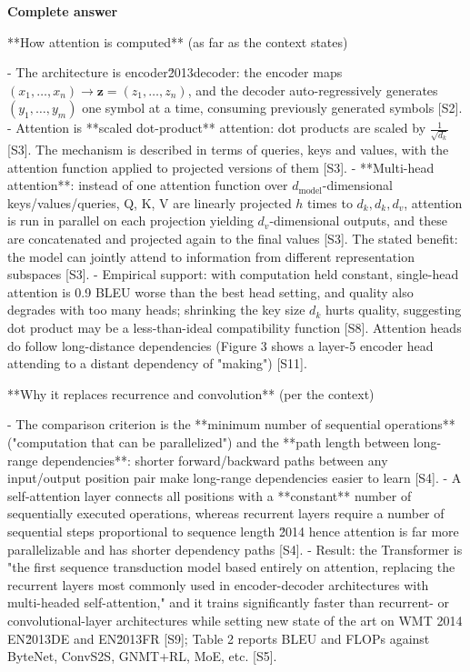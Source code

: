 \documentclass[10pt]{article}
\begin{document}
\textbf{Complete answer}
\begin{AnswerText}
**How attention is computed** (as far as the context states)

- The architecture is encoder\u2013decoder: the encoder maps $(x_1,\dots,x_n)\to \mathbf{z}=(z_1,\dots,z_n)$, and the decoder auto-regressively generates $(y_1,\dots,y_m)$ one symbol at a time, consuming previously generated symbols [S2].
- Attention is **scaled dot-product** attention: dot products are scaled by $\frac{1}{\sqrt{d_k}}$ [S3]. The mechanism is described in terms of queries, keys and values, with the attention function applied to projected versions of them [S3].
- **Multi-head attention**: instead of one attention function over $d_{\text{model}}$-dimensional keys/values/queries, Q, K, V are linearly projected $h$ times to $d_k,d_k,d_v$, attention is run in parallel on each projection yielding $d_v$-dimensional outputs, and these are concatenated and projected again to the final values [S3]. The stated benefit: the model can jointly attend to information from different representation subspaces [S3].
- Empirical support: with computation held constant, single-head attention is 0.9 BLEU worse than the best head setting, and quality also degrades with too many heads; shrinking the key size $d_k$ hurts quality, suggesting dot product may be a less-than-ideal compatibility function [S8]. Attention heads do follow long-distance dependencies (Figure 3 shows a layer-5 encoder head attending to a distant dependency of "making") [S11].

**Why it replaces recurrence and convolution** (per the context)

- The comparison criterion is the **minimum number of sequential operations** ("computation that can be parallelized") and the **path length between long-range dependencies**: shorter forward/backward paths between any input/output position pair make long-range dependencies easier to learn [S4].
- A self-attention layer connects all positions with a **constant** number of sequentially executed operations, whereas recurrent layers require a number of sequential steps proportional to sequence length \u2014 hence attention is far more parallelizable and has shorter dependency paths [S4].
- Result: the Transformer is "the first sequence transduction model based entirely on attention, replacing the recurrent layers most commonly used in encoder-decoder architectures with multi-headed self-attention," and it trains significantly faster than recurrent- or convolutional-layer architectures while setting new state of the art on WMT 2014 EN\u2013DE and EN\u2013FR [S9]; Table 2 reports BLEU and FLOPs against ByteNet, ConvS2S, GNMT+RL, MoE, etc. [S5].


\end{AnswerText}
\end{document}
